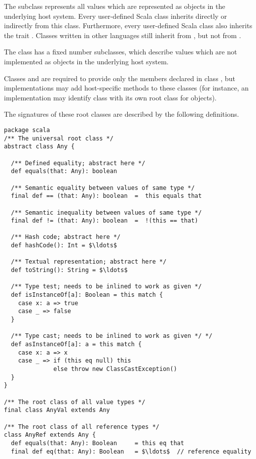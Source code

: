 {The subclass  represents all values which are represented
as objects in the underlying host system. Every user-defined Scala
class inherits directly or indirectly from this class. Furthermore,
every user-defined Scala class also inherits the trait
.  Classes written in other languages still
inherit from , but not from
.

The class  has a fixed number subclasses, which describe
values which are not implemented as objects in the underlying host
system.

Classes  and  are required to provide only
the members declared in class , but implementations may add
host-specific methods to these classes (for instance, an
implementation may identify class  with its own root
class for objects).

The signatures of these root classes are described by the following
definitions.

\begin{lstlisting}
package scala 
/** The universal root class */
abstract class Any {

  /** Defined equality; abstract here */
  def equals(that: Any): boolean 

  /** Semantic equality between values of same type */
  final def == (that: Any): boolean  =  this equals that

  /** Semantic inequality between values of same type */
  final def != (that: Any): boolean  =  !(this == that)

  /** Hash code; abstract here */
  def hashCode(): Int = $\ldots$

  /** Textual representation; abstract here */
  def toString(): String = $\ldots$

  /** Type test; needs to be inlined to work as given */
  def isInstanceOf[a]: Boolean = this match {
    case x: a => true
    case _ => false
  }

  /** Type cast; needs to be inlined to work as given */ */
  def asInstanceOf[a]: a = this match {
    case x: a => x
    case _ => if (this eq null) this
              else throw new ClassCastException()
  }
}

/** The root class of all value types */
final class AnyVal extends Any 

/** The root class of all reference types */
class AnyRef extends Any {
  def equals(that: Any): Boolean     = this eq that 
  final def eq(that: Any): Boolean   = $\ldots$  // reference equality
  

\end{lstlisting}}
